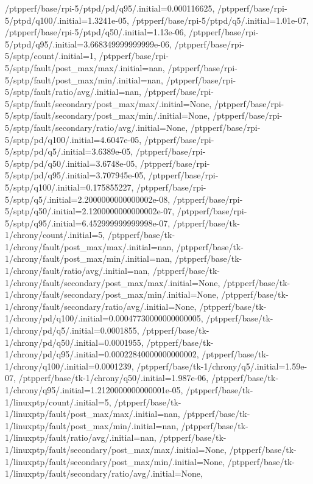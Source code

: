 {    /ptpperf/base/rpi-5/ptpd/pd/q95/.initial=0.000116625,
    /ptpperf/base/rpi-5/ptpd/q100/.initial=1.3241e-05,
    /ptpperf/base/rpi-5/ptpd/q5/.initial=1.01e-07,
    /ptpperf/base/rpi-5/ptpd/q50/.initial=1.13e-06,
    /ptpperf/base/rpi-5/ptpd/q95/.initial=3.668349999999999e-06,
    /ptpperf/base/rpi-5/sptp/count/.initial=1,
    /ptpperf/base/rpi-5/sptp/fault/post_max/max/.initial=nan,
    /ptpperf/base/rpi-5/sptp/fault/post_max/min/.initial=nan,
    /ptpperf/base/rpi-5/sptp/fault/ratio/avg/.initial=nan,
    /ptpperf/base/rpi-5/sptp/fault/secondary/post_max/max/.initial=None,
    /ptpperf/base/rpi-5/sptp/fault/secondary/post_max/min/.initial=None,
    /ptpperf/base/rpi-5/sptp/fault/secondary/ratio/avg/.initial=None,
    /ptpperf/base/rpi-5/sptp/pd/q100/.initial=4.6047e-05,
    /ptpperf/base/rpi-5/sptp/pd/q5/.initial=3.6389e-05,
    /ptpperf/base/rpi-5/sptp/pd/q50/.initial=3.6748e-05,
    /ptpperf/base/rpi-5/sptp/pd/q95/.initial=3.707945e-05,
    /ptpperf/base/rpi-5/sptp/q100/.initial=0.175855227,
    /ptpperf/base/rpi-5/sptp/q5/.initial=2.2000000000000002e-08,
    /ptpperf/base/rpi-5/sptp/q50/.initial=2.1200000000000002e-07,
    /ptpperf/base/rpi-5/sptp/q95/.initial=6.452999999999998e-07,
    /ptpperf/base/tk-1/chrony/count/.initial=5,
    /ptpperf/base/tk-1/chrony/fault/post_max/max/.initial=nan,
    /ptpperf/base/tk-1/chrony/fault/post_max/min/.initial=nan,
    /ptpperf/base/tk-1/chrony/fault/ratio/avg/.initial=nan,
    /ptpperf/base/tk-1/chrony/fault/secondary/post_max/max/.initial=None,
    /ptpperf/base/tk-1/chrony/fault/secondary/post_max/min/.initial=None,
    /ptpperf/base/tk-1/chrony/fault/secondary/ratio/avg/.initial=None,
    /ptpperf/base/tk-1/chrony/pd/q100/.initial=0.00047730000000000005,
    /ptpperf/base/tk-1/chrony/pd/q5/.initial=0.0001855,
    /ptpperf/base/tk-1/chrony/pd/q50/.initial=0.0001955,
    /ptpperf/base/tk-1/chrony/pd/q95/.initial=0.00022840000000000002,
    /ptpperf/base/tk-1/chrony/q100/.initial=0.0001239,
    /ptpperf/base/tk-1/chrony/q5/.initial=1.59e-07,
    /ptpperf/base/tk-1/chrony/q50/.initial=1.987e-06,
    /ptpperf/base/tk-1/chrony/q95/.initial=1.2120000000000001e-05,
    /ptpperf/base/tk-1/linuxptp/count/.initial=5,
    /ptpperf/base/tk-1/linuxptp/fault/post_max/max/.initial=nan,
    /ptpperf/base/tk-1/linuxptp/fault/post_max/min/.initial=nan,
    /ptpperf/base/tk-1/linuxptp/fault/ratio/avg/.initial=nan,
    /ptpperf/base/tk-1/linuxptp/fault/secondary/post_max/max/.initial=None,
    /ptpperf/base/tk-1/linuxptp/fault/secondary/post_max/min/.initial=None,
    /ptpperf/base/tk-1/linuxptp/fault/secondary/ratio/avg/.initial=None,
}
